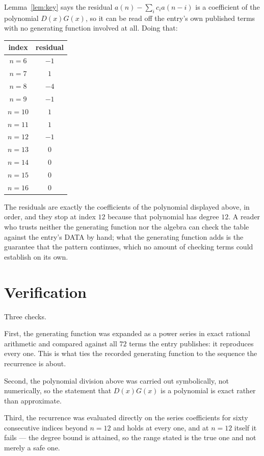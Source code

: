 \documentclass[11pt,a4paper]{article}
\theoremstyle{plain}
\theoremstyle{definition}
\begin{document}
Lemma~\ref{lem:key} says the residual $a(n)-\sum_ic_ia(n-i)$ is a coefficient of the
polynomial $D(x)G(x)$, so it can be read off the entry's own published terms with no
generating function involved at all. Doing that:
\begin{center}
\begin{tabular}{cc}
index & residual \\ \hline
$n=6$ & $-1$ \\
$n=7$ & $1$ \\
$n=8$ & $-4$ \\
$n=9$ & $-1$ \\
$n=10$ & $1$ \\
$n=11$ & $1$ \\
$n=12$ & $-1$ \\
$n=13$ & $0$ \\
$n=14$ & $0$ \\
$n=15$ & $0$ \\
$n=16$ & $0$
\end{tabular}
\end{center}
The residuals are exactly the coefficients of the polynomial displayed above, in order, and
they stop at index $12$ because that polynomial has degree $12$. A reader who trusts
neither the generating function nor the algebra can check the table against the entry's DATA
by hand; what the generating function adds is the guarantee that the pattern continues, which
no amount of checking terms could establish on its own.

\section{Verification}

Three checks.

First, the generating function was expanded as a power series in exact rational arithmetic and
compared against all $72$ terms the entry publishes: it reproduces every one. This is
what ties the recorded generating function to the sequence the recurrence is about.

Second, the polynomial division above was carried out symbolically, not numerically, so the
statement that $D(x)G(x)$ is a polynomial is exact rather than approximate.

Third, the recurrence was evaluated directly on the series coefficients for sixty consecutive
indices beyond $n=12$ and holds at every one, and at $n=12$ itself it fails --- the
degree bound is attained, so the range stated is the true one and not merely a safe one.
\end{document}
